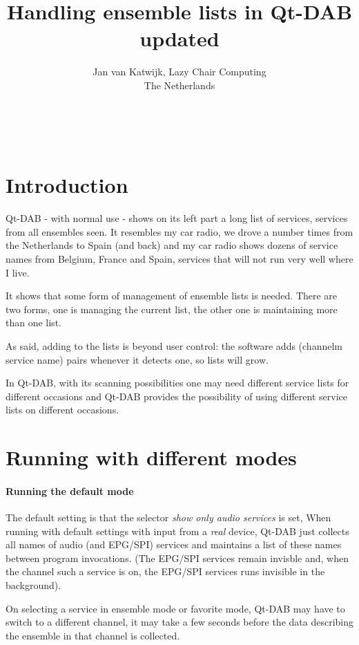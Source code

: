 \documentclass[11pt]{article}
\begin{document}
\title{Handling ensemble lists in Qt-DAB\\
updated}
\author{
Jan van Katwijk, 
Lazy Chair Computing \\
The Netherlands}

\maketitle
\ \\
\section{Introduction}
Qt-DAB - with normal use - shows on its left part a long list of services, services from all ensembles seen.
It resembles my car radio, we drove a number times from the Netherlands to Spain (and back) and my car radio shows dozens of service names from Belgium, France and Spain, services that will not run very well where I live.
\par
It shows that some form of management of ensemble lists is needed.
There are two forms, one is managing the current list, the other one is maintaining more than one list.
\par
As said, adding to the lists is beyond user control: the software adds (channelm service name) pairs whenever it detects one, so lists will grow.
\par
In Qt-DAB, with its scanning possibilities one may need different service lists for different occasions and Qt-DAB provides the possibility of using different service lists on different occasions.
\section{Running with different modes}
\paragraph{Running the default mode}
The default setting is that the selector {\em show only audio services} is set,
When running with default settings with input from a {\em real} device, Qt-DAB just collects all names of audio (and EPG/SPI) services and maintains a list of these names between program invocations. (The EPG/SPI services remain invisble and, when the channel such a service is on, the EPG/SPI services runs invisible in the background).
\par
On selecting a service in ensemble mode or favorite mode,
Qt-DAB may have to switch to a different channel, it may take
a few seconds before the data describing the ensemble
in that channel is collected.
\end{document}
